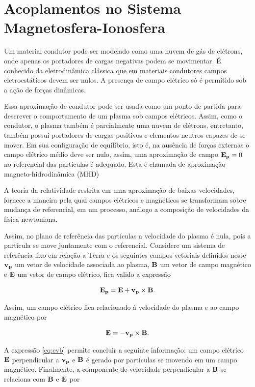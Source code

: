 \section{Acoplamentos no Sistema Magnetosfera-Ionosfera}

Um material condutor pode ser modelado como uma nuvem de gás de elétrons, onde apenas os portadores de cargas negativas podem se movimentar. É conhecido da eletrodinâmica clássica que em materiais condutores campos eletroestáticos devem ser nulos. A presença de campo elétrico só é permitido sob a ação de forças dinâmicas.

Essa aproximação de condutor pode ser usada como um ponto de partida para descrever o comportamento de um plasma sob campos elétricos. Assim, como o condutor, o plasma também é parcialmente uma nuvem de elétrons, entretanto, também possui portadores de cargas positivos e elementos neutros capazes de se mover. Em sua configuração de equilíbrio, isto é, na ausência de forças externas o campo elétrico médio deve ser nulo, assim, uma aproximação de campo ${\bf E_p}=0$ no referencial das partículas é adequado. Esta é chamada de aproximação magneto-hidrodinâmica (MHD) \cite{ROEDERER:1979} 

A teoria da relatividade restrita em uma aproximação de baixas velocidades, fornece a maneira pela qual campos elétricos e magnéticos se transformam sobre mudança de referencial, em um processo, análogo a composição de velocidades da física newtoniana.

Assim, no plano de referência das partículas a velocidade do plasma é nula, pois a partícula se move juntamente com o referencial. Considere um sistema de referência fixo em relação a Terra e os seguintes campos vetoriais definidos neste ${\bf v_p}$ um vetor de velocidade associada ao plasma, ${\bf B}$ um vetor de campo magnético e ${\bf E}$ um vetor de campo elétrico, fica valido a expressão

\begin{equation}
{\bf E_p}= {\bf E}+{\bf v_p}\times{\bf B}\mbox{.}
\end{equation}

Assim, um campo elétrico fica relacionado à velocidade do plasma e ao campo magnético por

\begin{equation}\label{eq:evb}
{\bf E}=-{\bf v_p}\times{\bf B}\mbox{.}
\end{equation}

A expressão \eqref{eq:evb} permite concluir a seguinte informação: um campo elétrico ${\bf E}$ perpendicular a ${\bf v_p}$ e ${\bf B}$ é gerado por partículas se movendo em um campo magnético. Finalmente, a componente de velocidade perpendicular a ${\bf B}$ se relaciona com ${\bf B}$ e ${\bf E}$ por

